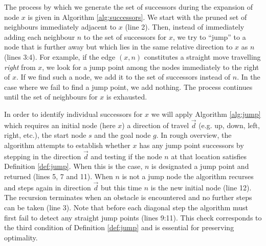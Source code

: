 The process by which we generate the set of successors during the expansion of 
node $x$ is given in Algorithm \ref{alg:successors}.
We start with the pruned set of neighbours immediately adjacent to $x$ (line 2).
Then, instead of immediately adding each neighbour $n$ to the set of successors
for $x$, we try to ``jump'' to a node that is further away but which lies in the 
same relative direction to $x$ as $n$ (lines 3:4). 
For example, if the edge $(x, n)$ constitutes a
straight move travelling \emph{right} from $x$, we look for a jump point among
the nodes immediately to the right of $x$.
If we find such a node, we add it to the set of successors instead of $n$.
In the case where we fail to find a jump point, we add nothing.
The process continues until the set of neighbours for $x$ is exhausted.

In order to identify individual successors for $x$ we will apply Algorithm
\ref{alg:jump} which requires an initial node (here $x$) a direction of travel
$\vec{d}$ (e.g. up, down, left, right, etc.), 
the start node $s$ and the goal node $g$.
In rough overview, the algorithm attempts to establish whether $x$ has any 
jump point successors by stepping in the direction $\vec{d}$ and testing
if the node $n$ at that location satisfies Definition \ref{def:jump}.
When this is the case, $n$ is designated a jump point and returned (lines 5, 7
and 11).
When $n$ is not a jump node the algorithm recurses and steps again in direction
$\vec{d}$ but this time $n$ is the new initial node (line 12).
The recursion terminates when an obstacle is encountered and no further
steps can be taken (line 3).
Note that before each diagonal step the algorithm must first 
fail to detect any straight jump points (lines 9:11). 
This check corresponds to the third condition of Definition \ref{def:jump} 
and is essential for preserving optimality.
